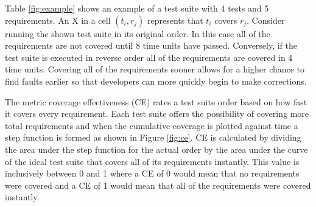 \documentclass{vgtc}                          %
\begin{document}
Table \ref{fig:example} shows an example of a test suite with 4 tests and 5 requirements.  An X in a cell $(t_i, r_j)$ represents that $t_i$ covers $r_j$.  Consider running the shown test suite in its original order.  In this case all of the requirements are not covered until 8 time units have passed.  Conversely, if the test suite is executed in reverse order all of the requirements are covered in 4 time units.  Covering all of the requirements sooner allows for a higher chance to find faults earlier so that developers can more quickly begin to make corrections.

The metric coverage effectiveness (CE) \cite{ce} rates a test suite order based on how fast it covers every requirement.  Each test suite offers the possibility of covering more total requirements and when the cumulative coverage is plotted against time a step function is formed as shown in Figure \ref{fig:ce}.  CE is calculated by dividing the area under the step function for the actual order by the area under the curve of the ideal test suite that covers all of its requirements instantly.  This value is inclusively between 0 and 1 where a CE of 0 would mean that no requirements were covered and a CE of 1 would mean that all of the requirements were covered instantly.
\begin{table}[t]
\centering
{}
\vspace{-.1in}
\caption{Example Test Suite}

\vspace{-.15in}

\end{table}
\label{fig:example}
\end{document}
